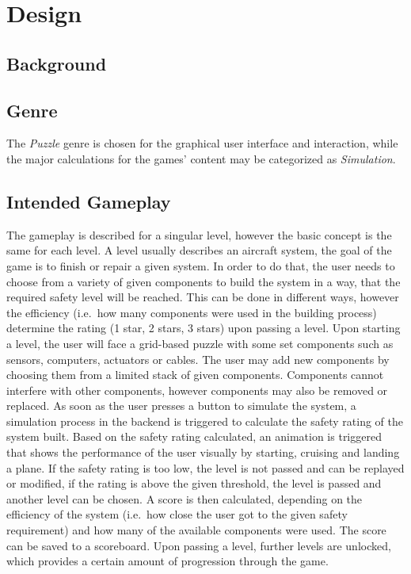 \section{Design}\label{sec:design}
\subsection{Background}\label{subsec:background}
\subsection{Genre}\label{subsec:genre}
The \textit{Puzzle} genre is chosen for the graphical user interface and interaction, while the major calculations for the
games' content may be categorized as \textit{Simulation}.

\subsection{Intended Gameplay}\label{subsec:intended-gameplay}
The gameplay is described for a singular level, however the basic concept is the same for each level.
A level usually describes an aircraft system, the goal of the game is to finish or repair a given system.
In order to do that, the user needs to choose from a variety of given components to build the system in a way, that the
required safety level will be reached.
This can be done in different ways, however the efficiency (i.e.\ how many components were used in the building process) determine
the rating (1 star, 2 stars, 3 stars) upon passing a level.
Upon starting a level, the user will face a grid-based puzzle with some set components such as sensors, computers, actuators
or cables.
The user may add new components by choosing them from a limited stack of given components.
Components cannot interfere with other components, however components may also be removed or replaced.
As soon as the user presses a button to simulate the system, a simulation process in the backend is triggered to calculate
the safety rating of the system built.
Based on the safety rating calculated, an animation is triggered that shows the performance of the user visually by starting, cruising
and landing a plane.
If the safety rating is too low, the level is not passed and can be replayed or modified, if the rating is above the given
threshold, the level is passed and another level can be chosen.
A score is then calculated, depending on the efficiency of the system (i.e.\ how close the user got to the given safety requirement) and
how many of the available components were used.
The score can be saved to a scoreboard.
Upon passing a level, further levels are unlocked, which provides a certain amount of progression through the game.

